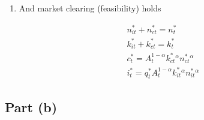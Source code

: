 \documentclass{scrartcl}
\begin{document}
\begin{itemize}
\begin{enumerate}
		\item And market clearing (feasibility) holds
		
		\begin{align}
		n^*_{it}+n^*_{ct}=n^*_{t} \label{eq:nclearing} \\
		k^*_{it}+k^*_{ct}=k^*_{t} \label{eq:kclearing} \\
		c^*_t=A_t^{1-\alpha}k^*_{ct}^\alpha n^*_{ct}^{\alpha} \\
		i^*_t=q^*_t A_t^{1-\alpha}k^*_{it}^\alpha n^*_{it}^{\alpha}
		\end{align}
		
	\end{enumerate}
	
\end{itemize}

\subsection*{Part (b)}
\end{document}
